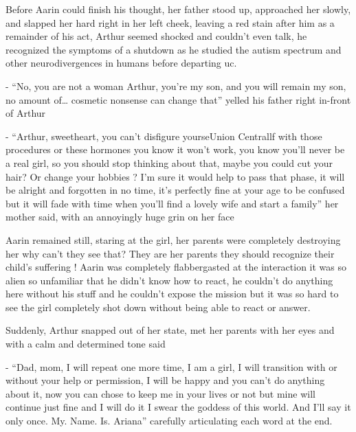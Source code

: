 \documentclass[hidelinks,12pt,a4paper]{book}
\begin{document}
Before Aarin could finish his thought, her father stood up, approached her slowly, and slapped her 
hard right in her left cheek, leaving a red stain after him as a remainder of his act, 
Arthur seemed shocked and couldn't even talk, he recognized the symptoms of a shutdown as he studied the 
autism spectrum and other neurodivergences in humans before departing \gls{uc}. \par
\bigskip

- “No, you are not a woman Arthur, you're my son, and you will remain my son, no amount of… 
cosmetic nonsense can change that” yelled his father right in-front of Arthur\newline

- “Arthur, sweetheart, you can't disfigure yourseUnion Centrallf with those procedures or 
these hormones you know it won't work, you know you'll never be a real girl, so you should stop
 thinking about that, maybe you could cut your hair? Or change your hobbies ? I'm sure it would help to pass that phase, 
 it will be alright and forgotten in no time, it's perfectly fine at your age to be confused but it will fade with
  time when you'll find a lovely wife and start a family” her mother said, with an annoyingly huge grin on her face\par
  \bigskip

Aarin remained still, staring at the girl, her parents were completely destroying her why can't they see that? 
They are her parents they should recognize their child's suffering ! Aarin was completely flabbergasted at the 
interaction it was so alien so unfamiliar that he didn't know how to react, he couldn't do anything here without his 
stuff and he couldn't expose the mission but it was so hard to see the girl completely shot down without being able 
to react or answer.\par
\bigskip

Suddenly, Arthur snapped out of her state, met her parents with her eyes and with a calm and determined tone said\newline

- “Dad, mom, I will repeat one more time, I am a girl, I will transition with or without your help or permission, 
I will be happy and you can't do anything about it, now you can chose to keep me in your lives or not but
 mine will continue just fine and I will do it I swear the goddess of this world. And I'll say it only once. 
 My. Name. Is. Ariana” carefully articulating each word at the end.\par
 \bigskip
\end{document}
